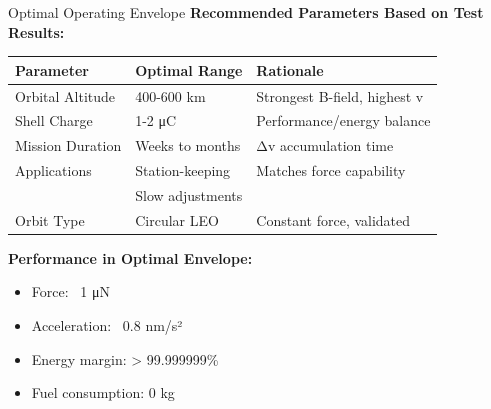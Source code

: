 \documentclass[aspectratio=169]{beamer}
\begin{document}
\begin{frame}{Optimal Operating Envelope}
\textbf{Recommended Parameters Based on Test Results:}

\vspace{0.5em}
\begin{table}
\begin{tabular}{lll}
\toprule
\textbf{Parameter} & \textbf{Optimal Range} & \textbf{Rationale} \\
\midrule
Orbital Altitude & 400-600 km & Strongest B-field, highest v \\
Shell Charge & 1-2 μC & Performance/energy balance \\
Mission Duration & Weeks to months & Δv accumulation time \\
Applications & Station-keeping & Matches force capability \\
 & Slow adjustments & \\
Orbit Type & Circular LEO & Constant force, validated \\
\bottomrule
\end{tabular}
\end{table}

\vspace{1em}
\textbf{Performance in Optimal Envelope:}
\begin{itemize}
    \item Force: ~1 μN
    \item Acceleration: ~0.8 nm/s²
    \item Energy margin: > 99.999999\%
    \item Fuel consumption: 0 kg
\end{itemize}
\end{frame}
\end{document}
